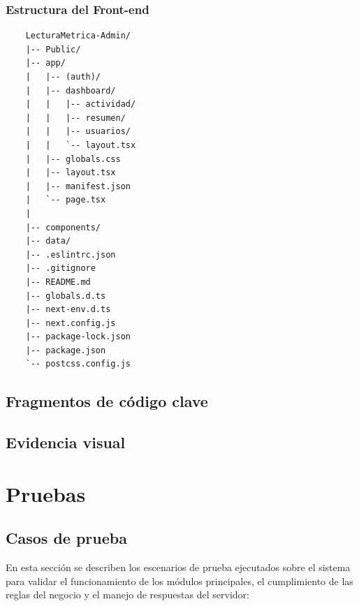 \documentclass[12pt, atypical, journal]{article}
\begin{document}
\subsubsection{Estructura del Front-end}
\begin{verbatim}
	LecturaMetrica-Admin/
	|-- Public/                              
	|-- app/                                 
	|   |-- (auth)/                          
	|   |-- dashboard/                       
	|   |   |-- actividad/                   
	|   |   |-- resumen/                     
	|   |   |-- usuarios/                   
	|   |   `-- layout.tsx                  
	|   |-- globals.css                      
	|   |-- layout.tsx                       
	|   |-- manifest.json                    
	|   `-- page.tsx                        
	|
	|-- components/                          
	|-- data/                                
	|-- .eslintrc.json
	|-- .gitignore
	|-- README.md
	|-- globals.d.ts
	|-- next-env.d.ts
	|-- next.config.js
	|-- package-lock.json
	|-- package.json
	`-- postcss.config.js
\end{verbatim}

\subsection{Fragmentos de código clave}

\subsection{Evidencia visual}

\newpage

\section{Pruebas}

\subsection{Casos de prueba}
En esta sección se describen los escenarios de prueba ejecutados sobre el sistema para validar el funcionamiento de los módulos principales, el cumplimiento de las reglas del negocio y el manejo de respuestas del servidor:
\end{document}
